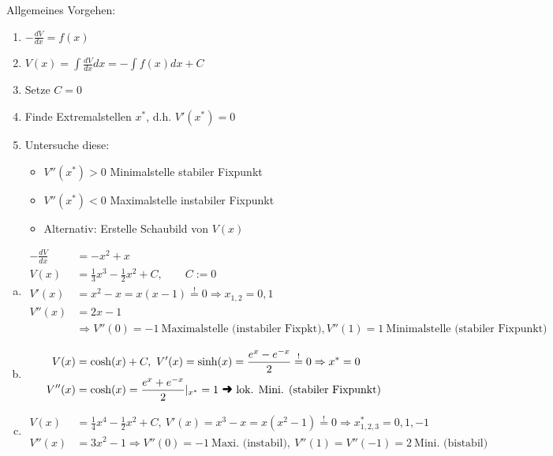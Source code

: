 \documentclass[11pt,a4paper]{article}
\begin{document}



\begin{loes}[Potentiale]
  Allgemeines Vorgehen:
  \begin{enumerate}
    \item $-\frac{d V}{dx} = f(x)$
    \item $V(x) = \int \frac{d V}{dx}dx = -\int f(x) dx + C$
    \item Setze $C = 0$
    \item Finde Extremalstellen $x^*$, d.h. $V'(x^*) = 0$
    \item Untersuche diese: \begin{itemize} \item[] $V''(x^*) >0$  Minimalstelle  stabiler Fixpunkt \item[] $V''(x^*) < 0$  Maximalstelle  instabiler Fixpunkt \item Alternativ: Erstelle Schaubild von $V(x) $\end{itemize}
  \end{enumerate}
  \begin{enumerate}[a)]
    \item \begin{align*} -\frac{dV}{dx} &= -x^2 +x \\ V(x) &= \frac{1}{3} x^3 - \frac{1}{2}x^2 + C, \qquad C := 0 \\ V'(x) &= x^2 - x = x(x-1) \stackrel{!}{=} 0 \Rightarrow x_{1,2} = 0,1 \\ V''(x) &= 2x -1 \\ &\Rightarrow V''(0) = -1 \ \textrm{Maximalstelle (instabiler Fixpkt)},  V''(1) = 1 \ \textrm{Minimalstelle (stabiler Fixpunkt)}\end{align*}
\item \begin{align*} V(x) & = \cosh(x) + C, \  V'(x) = \sinh(x) = \frac{e^x - e^{-x}}{2} \stackrel{!}{=}0 \Rightarrow x^* = 0 \\ V''(x) &= \cosh(x) = \frac{e^x + e^{-x}}{2}|_{x^*} = 1 \ \textrm{\ding{220} lok. Mini. (stabiler Fixpunkt)}  \end{align*}
\item \begin{align*} V(x) & = \frac{1}{4}x^4 - \frac{1}{2}x^2 + C, \  V'(x) = x^3 - x = x(x^2-1)\stackrel{!}{=}0 \Rightarrow x^*_{1,2,3} = 0,1,-1 \\ V''(x) &= 3x^2-1 \Rightarrow V''(0) = -1 \ \textrm{Maxi. (instabil)}, \ V''(1) = V''(-1) = 2 \ \textrm{Mini. (bistabil)} \end{align*}
  \end{enumerate}
\end{loes}
\end{document}
